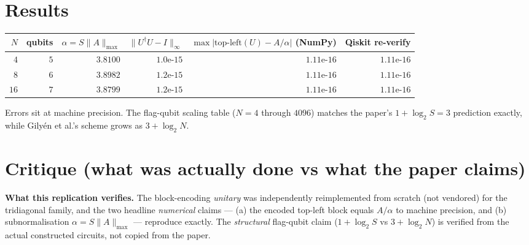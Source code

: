 \documentclass[11pt]{article}
\begin{document}
\section{Results}
\begin{center}
\begin{tabular}{rrrrrr}
\toprule
$N$ & qubits & $\alpha = S\|A\|_{\max}$ & $\|U^\dagger U - I\|_\infty$
    & $\max|\text{top-left}(U) - A/\alpha|$ (NumPy)
    & Qiskit re-verify \\
\midrule
$4$  & $5$ & $3.8100$ & $1.0\text{e-}15$ & $1.11\text{e-}16$ & $1.11\text{e-}16$ \\
$8$  & $6$ & $3.8982$ & $1.2\text{e-}15$ & $1.11\text{e-}16$ & $1.11\text{e-}16$ \\
$16$ & $7$ & $3.8799$ & $1.2\text{e-}15$ & $1.11\text{e-}16$ & $1.11\text{e-}16$ \\
\bottomrule
\end{tabular}
\end{center}
Errors sit at machine precision. The flag-qubit scaling table
($N = 4$ through $4096$) matches the paper's $1 + \log_2 S = 3$
prediction exactly, while Gily\'en et al.'s scheme grows as
$3 + \log_2 N$.

\section{Critique (what was actually done vs what the paper claims)}

\textbf{What this replication verifies.}
The block-encoding \emph{unitary} was independently reimplemented from
scratch (not vendored) for the tridiagonal family, and the two headline
\emph{numerical} claims --- (a) the encoded top-left block equals
$A/\alpha$ to machine precision, and (b) subnormalisation
$\alpha = S \|A\|_{\max}$ --- reproduce exactly. The
\emph{structural} flag-qubit claim ($1 + \log_2 S$ vs
$3 + \log_2 N$) is verified from the actual constructed circuits, not
copied from the paper.
\end{document}
